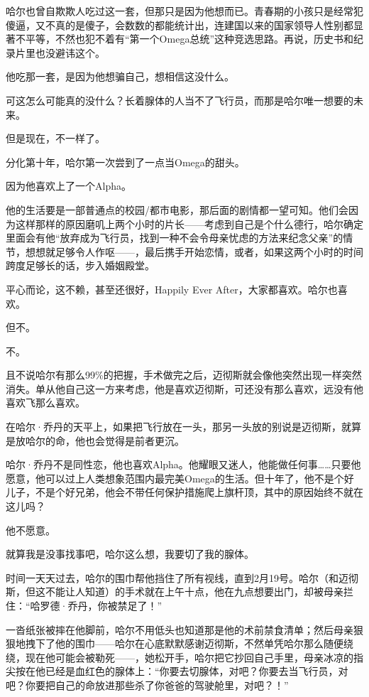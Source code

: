 \documentclass[../main]{subfiles}
\begin{document}
哈尔也曾自欺欺人吃过这一套，但那只是因为他想而已。青春期的小孩只是经常犯傻逼，又不真的是傻子，会数数的都能统计出，连建国以来的国家领导人性别都显著不平等，不然也犯不着有“第一个Omega总统”这种竞选思路。再说，历史书和纪录片里也没避讳这个。

他吃那一套，是因为他想骗自己，想相信这没什么。

可这怎么可能真的没什么？长着腺体的人当不了飞行员，而那是哈尔唯一想要的未来。

但是现在，不一样了。

分化第十年，哈尔第一次尝到了一点当Omega的甜头。

因为他喜欢上了一个Alpha。

他的生活要是一部普通点的校园/都市电影，那后面的剧情都一望可知。他们会因为这样那样的原因磨叽上两个小时的片长——考虑到自己是个什么德行，哈尔确定里面会有他“放弃成为飞行员，找到一种不会令母亲忧虑的方法来纪念父亲”的情节，想想就足够令人作呕——，最后携手开始恋情，或者，如果这两个小时的时间跨度足够长的话，步入婚姻殿堂。

平心而论，这不赖，甚至还很好，Happily Ever
After，大家都喜欢。哈尔也喜欢。

但不。

不。

且不说哈尔有那么99\%的把握，手术做完之后，迈彻斯就会像他突然出现一样突然消失。单从他自己这一方来考虑，他是喜欢迈彻斯，可还没有那么喜欢，远没有他喜欢飞那么喜欢。

在哈尔·乔丹的天平上，如果把飞行放在一头，那另一头放的别说是迈彻斯，就算是放哈尔的命，他也会觉得是前者更沉。

哈尔·乔丹不是同性恋，他也喜欢Alpha。他耀眼又迷人，他能做任何事……只要他愿意，他可以过上人类想象范围内最完美Omega的生活。但十年了，他不是个好儿子，不是个好兄弟，他会不带任何保护措施爬上旗杆顶，其中的原因始终不就在这儿吗？

他不愿意。

就算我是没事找事吧，哈尔这么想，我要切了我的腺体。

时间一天天过去，哈尔的围巾帮他挡住了所有视线，直到2月19号。哈尔（和迈彻斯，但这不能让人知道）的手术就在上午十点，他在九点想要出门，却被母亲拦住：“哈罗德·乔丹，你被禁足了！”

一沓纸张被摔在他脚前，哈尔不用低头也知道那是他的术前禁食清单；然后母亲狠狠地拽下了他的围巾——哈尔在心底默默感谢迈彻斯，不然单凭哈尔那么随便绕绕，现在他可能会被勒死——，她松开手，哈尔把它抄回自己手里，母亲冰凉的指尖按在他已经是血红色的腺体上：“你要去切腺体，对吧？你要去当飞行员，对吧？你要把自己的命放进那些杀了你爸爸的驾驶舱里，对吧？！”
\end{document}
